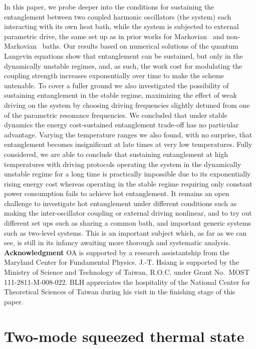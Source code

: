 \documentclass[11pt,a4paper]{article}
\begin{document}
In this paper, we probe deeper into the conditions for sustaining the entanglement between two coupled harmonic oscillators (the system) each interacting with its own heat bath, while the system is subjected to external parametric drive,  the same set up as in prior works for Markovian~\cite{galve-prl} and non-Markovian~\cite{EstPac} baths. Our results based on numerical solutions of the quantum Langevin equations show that entanglement can be sustained, but  only in the dynamically unstable regimes, and, as such, the work cost for modulating the coupling strength increases exponentially over time to make the scheme untenable. To cover a fuller ground we also investigated the possibility of sustaining entanglement in the stable regime, maximizing the effect of weak driving on the system by choosing driving frequencies slightly detuned from one of the parametric resonance frequencies. We concluded that under stable dynamics the energy cost-sustained entanglement trade-off has no particular advantage. Varying the temperature ranges we also found, with no surprise, that entanglement becomes insignificant at late times at very low temperatures. Fully considered, we are able to conclude that sustaining entanglement at high temperatures with driving protocols operating the system in the dynamically unstable regime for a long time is practically impossible due to its exponentially rising energy cost whereas operating in the stable regime requiring only constant power consumption fails to achieve hot entanglement. It remains an open challenge to investigate hot entanglement under different conditions such as making the inter-oscillator coupling or external driving nonlinear, and to try out different set ups such as sharing a common bath, and important generic systems such as two-level systems. This is an important subject which, as far as we can see, is still in its infancy awaiting more
thorough and systematic analysis. \\


\textbf{Acknowledgment} OA is supported by a research assistantship from the Maryland Center for Fundamental Physics.  J.-T. Hsiang is supported by the Ministry of Science and Technology of Taiwan, R.O.C. under Grant No.~MOST 111-2811-M-008-022. BLH appreciates the hospitality of the National Center for Theoretical Sciences of Taiwan during his visit in the finishing stage of this paper. 

\newpage

\appendix


\section{Two-mode squeezed thermal state}\label{S:peotr}
\end{document}
